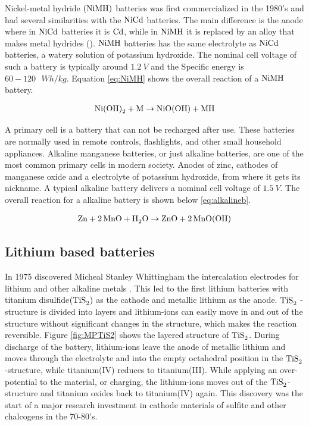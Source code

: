Nickel-metal hydride $(\ce{NiMH})$  batteries was first commercialized in the 1980's and had several similarities with the $\ce{NiCd}$ batteries. The main difference is the anode where in  $\ce{NiCd}$ batteries it is  $\ce{Cd}$, while in $\ce{NiMH}$ it is replaced by an alloy that makes metal hydrides (). $\ce{NiMH}$ batteries has the same electrolyte as $\ce{NiCd}$ batteries, a watery solution of potassium hydroxide. The nominal cell voltage of such a battery is typically around $\SI{1.2}{V}$ and the Specific energy is $60-120\text{ } \si{Wh/kg}$. Equation \ref{eq:NiMH} shows the overall reaction of a $\ce{NiMH}$ battery.

\begin{align}\label{eq:NiMH}
\ce{Ni(OH)_2} + \ce{M} \rightarrow \ce{NiO(OH)} + \ce{MH}
\end{align}

A primary cell is a battery that can not be recharged after use. These batteries are normally used in remote controls, flashlights, and other small household appliances. Alkaline manganese batteries, or just alkaline batteries, are one of the most common primary cells in modern society. Anodes of zinc, cathodes of manganese oxide and a electrolyte of potassium hydroxide, from where it gets its nickname. A typical alkaline battery delivers a nominal cell voltage of $\SI{1.5}{V}$. The overall reaction for a alkaline battery is shown below \ref{eq:alkalineb}.

\begin{align}\label{eq:alkalineb}
\ce{Zn} + \ce{2MnO} +\ce{H_2O} \rightarrow \ce{ZnO} + \ce{2MnO(OH)}
\end{align}

\subsection{Lithium based batteries}

In 1975 discovered Micheal Stanley Whittingham the intercalation electrodes for lithium and other alkaline metals \cite{whittingham1975lithium}. This led to the first lithium batteries with titanium disulfide$(\ce{TiS_2})$ as the cathode and metallic lithium as the anode. $\ce{TiS_2}$ -structure is divided into layers and lithium-ions can easily move in and out of the structure without significant changes in the structure, which makes the reaction reversible. Figure \ref{fig:MPTiS2} shows the layered structure of $\ce{TiS_2}$. During discharge of the battery, lithium-ions leave the anode of metallic lithium and moves through the electrolyte and into the empty octahedral position in the $\ce{TiS_2}$-structure, while titanium(IV) reduces to titanium(III). While applying an over-potential to the material, or charging, the lithium-ions moves out of the $\ce{TiS_2}$-structure and titanium oxides back to titanium(IV) again. This discovery was the start of a major research investment in cathode materials of sulfite and other chalcogens in the 70-80's. 


